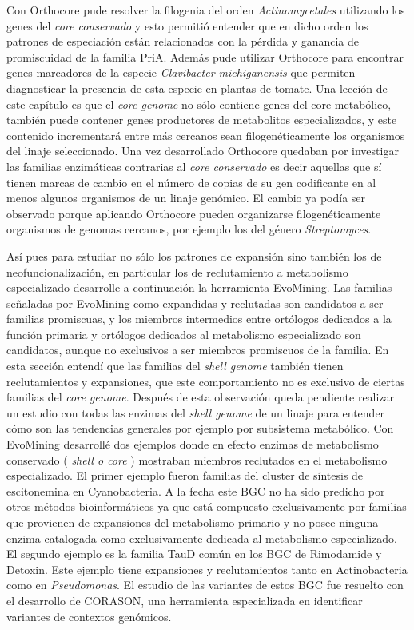 \documentclass[12pt,twoside]{reedthesis}
\begin{document}
  Con Orthocore pude resolver la filogenia del orden
  \emph{Actinomycetales} utilizando los genes del \emph{core conservado} y
  esto permitió entender que en dicho orden los patrones de especiación
  están relacionados con la pérdida y ganancia de promiscuidad de la
  familia PriA. Además pude utilizar Orthocore para encontrar genes
  marcadores de la especie \emph{Clavibacter michiganensis} que permiten
  diagnosticar la presencia de esta especie en plantas de tomate. Una
  lección de este capítulo es que el \emph{core genome} no sólo contiene
  genes del core metabólico, también puede contener genes productores de
  metabolitos especializados, y este contenido incrementará entre más
  cercanos sean filogenéticamente los organismos del linaje seleccionado.
  Una vez desarrollado Orthocore quedaban por investigar las familias
  enzimáticas contrarias al \emph{core conservado} es decir aquellas que
  sí tienen marcas de cambio en el número de copias de su gen codificante
  en al menos algunos organismos de un linaje genómico. El cambio ya podía
  ser observado porque aplicando Orthocore pueden organizarse
  filogenéticamente organismos de genomas cercanos, por ejemplo los del
  género \emph{Streptomyces}.
  
  Así pues para estudiar no sólo los patrones de expansión sino también
  los de neofuncionalización, en particular los de reclutamiento a
  metabolismo especializado desarrolle a continuación la herramienta
  EvoMining. Las familias señaladas por EvoMining como expandidas y
  reclutadas son candidatos a ser familias promiscuas, y los miembros
  intermedios entre ortólogos dedicados a la función primaria y ortólogos
  dedicados al metabolismo especializado son candidatos, aunque no
  exclusivos a ser miembros promiscuos de la familia. En esta sección
  entendí que las familias del \emph{shell genome} también tienen
  reclutamientos y expansiones, que este comportamiento no es exclusivo de
  ciertas familias del \emph{core genome}. Después de esta observación
  queda pendiente realizar un estudio con todas las enzimas del
  \emph{shell genome} de un linaje para entender cómo son las tendencias
  generales por ejemplo por subsistema metabólico. Con EvoMining
  desarrollé dos ejemplos donde en efecto enzimas de metabolismo
  conservado ( \emph{shell o core} ) mostraban miembros reclutados en el
  metabolismo especializado. El primer ejemplo fueron familias del cluster
  de síntesis de escitonemina en Cyanobacteria. A la fecha este BGC no ha
  sido predicho por otros métodos bioinformáticos ya que está compuesto
  exclusivamente por familias que provienen de expansiones del metabolismo
  primario y no posee ninguna enzima catalogada como exclusivamente
  dedicada al metabolismo especializado. El segundo ejemplo es la familia
  TauD común en los BGC de Rimodamide y Detoxin. Este ejemplo tiene
  expansiones y reclutamientos tanto en Actinobacteria como en
  \emph{Pseudomonas}. El estudio de las variantes de estos BGC fue
  resuelto con el desarrollo de CORASON, una herramienta especializada en
  identificar variantes de contextos genómicos.
  
\end{document}
